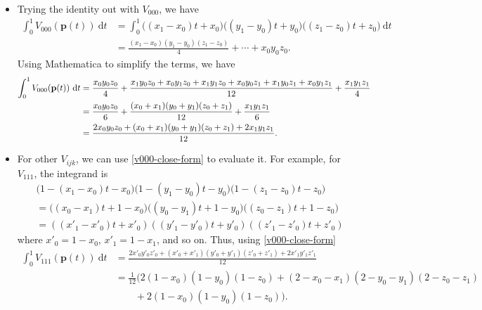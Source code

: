 \documentclass[10pt]{article}
\newcommand{\dee}{\mathrm{d}}
\begin{document}
\begin{itemize}
    \item Trying the identity out with $V_{000}$,
        we have
        \begin{align*}
            \int_0^1 V_{000}(\mathbf{p}(t))\ \dee t
            &= \int_0^1 \big( (x_1-x_0)t + x_0 \big)
                \big( (y_1-y_0)t + y_0 \big)
                \big( (z_1-z_0)t + z_0 \big)\ \dee t\\
            &= \frac{(x_1-x_0)(y_1-y_0)(z_1-z_0)}{4} +
                \dotsb + x_0 y_0 z_0.
        \end{align*}
        Using Mathematica to simplify the terms,
        we have
        \begin{align} \label{v000-close-form}
            \int_0^1 V_{000}(\mathbf{p}(t))\ \dee t
            &= \frac{x_0 y_0 z_0}{4} +
                \frac{x_1 y_0 z_0 + x_0 y_1 z_0 + x_1 y_1 z_0 +
                    x_0 y_0 z_1 + x_1 y_0 z_1 + x_0 y_1 z_1}{12} +
                \frac{x_1 y_1 z_1}{4} \notag\\
            &= \frac{x_0 y_0 z_0}{6} 
                + \frac{(x_0+x_1)(y_0+y_1)(z_0+z_1)}{12}
                + \frac{x_1 y_1 z_1}{6} \notag\\
            &= \frac{2x_0y_0z_0 +
                 (x_0+x_1)(y_0+y_1)(z_0+z_1) + 
                 2x_1 y_1 z_1}{12}.
        \end{align}
        
    \item For other $V_{ijk}$, we can use \eqref{v000-close-form}
        to evaluate it. For example, for $V_{111}$, the integrand
        is
        \begin{align*}
            & \big(1 - (x_1-x_0)t - x_0 \big)
                \big(1 - (y_1-y_0)t - y_0 \big)
                \big(1 - (z_1-z_0)t - z_0 \big)\\
            &= \big((x_0-x_1)t + 1 - x_0 \big)
                \big((y_0-y_1)t + 1 - y_0 \big)
                \big((z_0-z_1)t + 1 - z_0 \big) \\
            &= ((x'_1 - x'_0)t + x'_0)
                ((y'_1 - y'_0)t + y'_0)
                ((z'_1 - z'_0)t + z'_0)
        \end{align*}
        where $x'_0 = 1 - x_0$, $x'_1 = 1 - x_1$, and so on.
        Thus, using \eqref{v000-close-form}
        \begin{align*}
            \int_0^1 V_{111}(\mathbf{p}(t))\ \dee t
            &= \frac{2x'_0y'_0z'_0 +
                 (x'_0+x'_1)(y'_0+y'_1)(z'_0+z'_1) + 
                 2x'_1 y'_1 z'_1}{12}\\
            &= \frac{1}{12}\bigg( 2(1-x_0)(1-y_0)(1-z_0)
                + (2-x_0-x_1)(2-y_0-y_1)(2-z_0-z_1)\\
            & \qquad + 2(1-x_0)(1-y_0)(1-z_0) \bigg).
        \end{align*}
\end{itemize}
\end{document}

